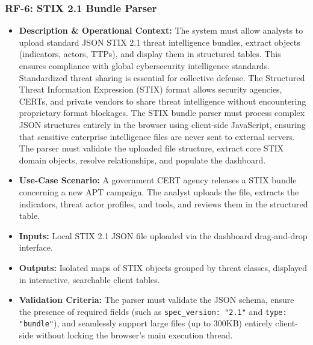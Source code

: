 \subsubsection{RF-6: STIX 2.1 Bundle Parser}
\begin{itemize}
    \item \textbf{Description \& Operational Context:} The system must allow analysts to upload standard JSON STIX 2.1 threat intelligence bundles, extract objects (indicators, actors, TTPs), and display them in structured tables. This ensures compliance with global cybersecurity intelligence standards. Standardized threat sharing is essential for collective defense. The Structured Threat Information Expression (STIX) format allows security agencies, CERTs, and private vendors to share threat intelligence without encountering proprietary format blockages. The STIX bundle parser must process complex JSON structures entirely in the browser using client-side JavaScript, ensuring that sensitive enterprise intelligence files are never sent to external servers. The parser must validate the uploaded file structure, extract core STIX domain objects, resolve relationships, and populate the dashboard.
    \item \textbf{Use-Case Scenario:} A government CERT agency releases a STIX bundle concerning a new APT campaign. The analyst uploads the file, extracts the indicators, threat actor profiles, and tools, and reviews them in the structured table.
    \item \textbf{Inputs:} Local STIX 2.1 JSON file uploaded via the dashboard drag-and-drop interface.
    \item \textbf{Outputs:} Isolated maps of STIX objects grouped by threat classes, displayed in interactive, searchable client tables.
    \item \textbf{Validation Criteria:} The parser must validate the JSON schema, ensure the presence of required fields (such as \texttt{spec\_version: "2.1"} and \texttt{type: "bundle"}), and seamlessly support large files (up to 300KB) entirely client-side without locking the browser's main execution thread.
\end{itemize}

